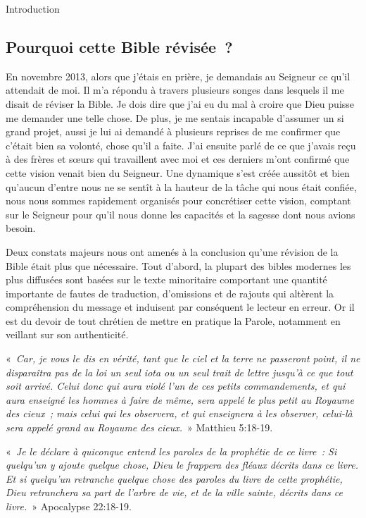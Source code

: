 \begin{center}{\LARGE Introduction}\end{center}
\begin{small}
\subsection*{Pourquoi cette Bible révisée~?}

En novembre 2013, alors que j'étais en prière, je demandais au Seigneur ce qu'il attendait de moi. Il m'a répondu à travers plusieurs songes dans lesquels il me disait de réviser la Bible. Je dois dire que j'ai eu du mal à croire que Dieu puisse me demander une telle chose. De plus, je me sentais incapable d'assumer un si grand projet, aussi je lui ai demandé à plusieurs reprises de me confirmer que c'était bien sa volonté, chose qu'il a faite. J'ai ensuite parlé de ce que j'avais reçu à des frères et sœurs qui travaillent avec moi et ces derniers m'ont confirmé que cette vision venait bien du Seigneur. Une dynamique s'est créée aussitôt et bien qu'aucun d'entre nous ne se sentît à la hauteur de la tâche qui nous était confiée, nous nous sommes rapidement organisés pour concrétiser cette vision, comptant sur le Seigneur pour qu'il nous donne les capacités et la sagesse dont nous avions besoin.\bigskip

Deux constats majeurs nous ont amenés à la conclusion qu'une révision de la Bible était plus que nécessaire. Tout d'abord, la plupart des bibles modernes les plus diffusées sont basées sur le texte minoritaire comportant une quantité importante de fautes de traduction, d'omissions et de rajouts qui altèrent la compréhension du message et induisent par conséquent le lecteur en erreur. Or il est du devoir de tout chrétien de mettre en pratique la Parole, notamment en veillant sur son authenticité.\bigskip

«~\emph{Car, je vous le dis en vérité, tant que le ciel et la terre ne passeront point, il ne disparaîtra pas de la loi un seul iota ou un seul trait de lettre jusqu'à ce que tout soit arrivé. Celui donc qui aura violé l'un de ces petits commandements, et qui aura enseigné les hommes à faire de même, sera appelé le plus petit au Royaume des cieux~; mais celui qui les observera, et qui enseignera à les observer, celui-là sera appelé grand au Royaume des cieux.}~» Matthieu 5:18-19.\bigskip

«~\emph{Je le déclare à quiconque entend les paroles de la prophétie de ce livre~: Si quelqu'un y ajoute quelque chose, Dieu le frappera des fléaux décrits dans ce livre. Et si quelqu'un retranche quelque chose des paroles du livre de cette prophétie, Dieu retranchera sa part de l'arbre de vie, et de la ville sainte, décrits dans ce livre.}~» Apocalypse 22:18-19.\bigskip


\end{small}

